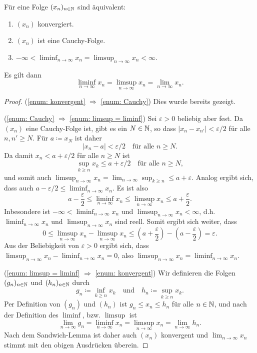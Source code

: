 \documentclass[a4paper,10pt]{article}
\begin{document}
\begin{prop}
 Für eine Folge $(x_n)_{n \in \mathbb{N}}$ sind äquivalent:
 \begin{enumerate}
  \item\label{enum: konvergent}
   $(x_n)$ konvergiert.
  \item\label{enum: Cauchy}
   $(x_n)$ ist eine Cauchy-Folge.
  \item\label{enum: limsup = liminf}
   $-\infty < \liminf_{n \to \infty} x_n = \limsup_{n \to \infty} x_n < \infty$.
 \end{enumerate}
 Es gilt dann
 \[
  \liminf_{n \to \infty} x_n = \limsup_{n \to \infty} x_n = \lim_{n \to \infty} x_n.
 \]
\end{prop}
\begin{proof}
 (\ref{enum: konvergent} $\Rightarrow$ \ref{enum: Cauchy}) Dies wurde bereits gezeigt.
 
 (\ref{enum: Cauchy} $\Rightarrow$ \ref{enum: limsup = liminf}) Sei $\varepsilon > 0$ beliebig aber fest. Da $(x_n)$ eine Cauchy-Folge ist, gibt es ein $N \in \mathbb{N}$, so dass $|x_n - x_{n'}| < \varepsilon/2$ für alle $n, n' \geq N$. Für $a \coloneqq x_N$ ist daher
 \[
  |x_n - a| < \varepsilon/2 \quad \text{für alle $n \geq N$}.
 \]
 Da damit $x_n < a + \varepsilon/2$ für alle $n \geq N$ ist
 \[
  \sup_{k \geq n} x_k \leq a + \varepsilon/2 \quad \text{für alle $n \geq N$},
 \]
 und somit auch $\limsup_{n \to \infty} x_n = \lim_{n \to \infty} \sup_{k \geq n} \leq a + \varepsilon$. Analog ergibt sich, dass auch $a-\varepsilon/2 \leq \liminf_{n \to \infty} x_n$. Es ist also
 \[
  a - \frac{\varepsilon}{2}
  \leq \liminf_{n \to \infty} x_n
  \leq \limsup_{n \to \infty} x_n
  \leq a + \frac{\varepsilon}{2}.
 \]
 Inbesondere ist $-\infty < \liminf_{n \to \infty} x_n$ und $\limsup_{n \to \infty} x_n < \infty$, d.h. $\liminf_{n \to \infty} x_n$ und $\limsup_{n \to \infty} x_n$ sind reell. Somit ergibt sich weiter, dass
 \[
  0
  \leq \limsup_{n \to \infty} x_n - \limsup_{n \to \infty} x_n
  \leq \left(a + \frac{\varepsilon}{2}\right) - \left(a - \frac{\varepsilon}{2}\right)
  = \varepsilon.
 \]
 Aus der Beliebigkeit von $\varepsilon > 0$ ergibt sich, dass $\limsup_{n \to \infty} x_n - \liminf_{n \to \infty} x_n = 0$, also $\limsup_{n \to \infty} x_n = \liminf_{n \to \infty} x_n$.
 
 (\ref{enum: limsup = liminf} $\Rightarrow$ \ref{enum: konvergent}) Wir definieren die Folgen $(g_n)_{n \in \mathbb{N}}$ und $(h_n)_{n \in \mathbb{N}}$ durch
 \[
  g_n \coloneqq \inf_{k \geq n} x_k \quad \text{und} \quad h_n \coloneqq \sup_{k \geq n} x_k.
 \]
 Per Definition von $(g_n)$ und $(h_n)$ ist $g_n \leq x_n \leq h_n$ für alle $n \in \mathbb{N}$, und nach der Definition des $\liminf$, bzw. $\limsup$ ist
 \[
 \lim_{n \to \infty} g_n = \liminf_{n \to \infty} x_n = \limsup_{n \to \infty} x_n = \lim_{n \to \infty} h_n.
 \]
 Nach dem Sandwich-Lemma ist daher auch $(x_n)$ konvergent und $\lim_{n \to \infty} x_n$ stimmt mit den obigen Ausdrücken überein.
\end{proof}
\end{document}
